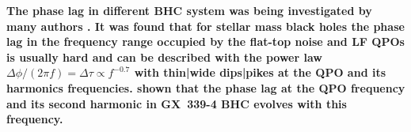 \documentclass[a4paper,fleqn,usenatbib]{mnras}
\begin{document}
{\bf 
The phase lag in different BHC system was being investigated by many authors \citep[see, e.g.][]{1997ApJ...474L..43V, 2003A&A...407..335M, 2006A&A...449..703R, 2010MNRAS.407.2166G, 2011A&A...533A...8B, 2011MNRAS.415..292M, 2012MNRAS.427.2985C, 2013MNRAS.435.2132M, 2017MNRAS.465.1926Y, 2017MNRAS.471.1475D, 2017ApJ...845..143Z, 2017MNRAS.464.2643V, 2018MNRAS.473.4644R}.
It was found that for stellar mass black holes the phase lag in the frequency range occupied by the flat-top noise and LF QPOs is usually hard and can be described with the power law $\Delta \phi /(2\pi f) = \Delta \tau \propto f^{-0.7}$ with thin|wide dips|pikes at the QPO and its harmonics frequencies. 
\citet{2017ApJ...845..143Z} shown that the phase lag at the QPO frequency and its second harmonic in GX~339-4 BHC evolves with this frequency. 

}
\end{document}

